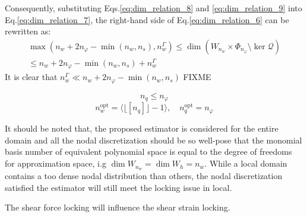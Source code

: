 Consequently, substituting Eqs.\eqref{eq:dim_relation_8} and \eqref{eq:dim_relation_9} into Eq.\eqref{eq:dim_relation_7}, the right-hand side of Eq.\eqref{eq:dim_relation_6} can be rewritten as:
\begin{multline}
    \max(n_w + 2n_\varphi - \min (n_w,n_s),n_w^\Gamma) \le
    \dim\left(W_{n_w}\times\Phi_{n_\varphi}\setminus\ker\mathcal Q\right) \\ \le
    n_w + 2n_\varphi - \min (n_w,n_s) + n_w^\Gamma
\end{multline}
It is clear that $n_w^\Gamma \ll n_w + 2n_\varphi - \min (n_w,n_s)$ 
FIXME

\begin{equation}
n_q \le n_\varphi
\end{equation}
\begin{equation}\label{eq:opt_n}
    n_w^{\mathrm{opt}} = \langle\lfloor[n_q]\rfloor-1\rangle
    ,\quad
    n_q^{\mathrm{opt}} = n_\varphi
\end{equation}

\begin{rmk}
It should be noted that, the proposed estimator is considered for the entire domain and all the nodal discretization should be so well-pose that the monomial basis number of equivalent polynomial space is equal to the degree of freedoms for approximation space, i.g $\dim W_{n_w} = \dim W_h = n_w$.
While a local domain contains a too dense nodal distribution than others, the nodal discretization satisfied the estimator will still meet the locking issue in local.
\end{rmk}

\begin{rmk}
The shear force locking will influence the shear strain locking.
\end{rmk}